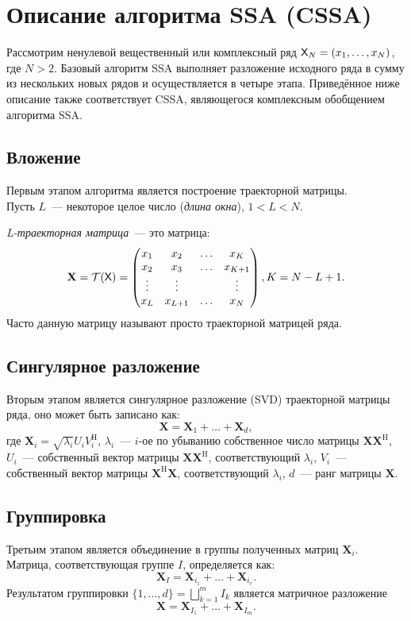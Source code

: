\documentclass[specialist,
               substylefile = spbu.rtx,
               subf,href,colorlinks=true, 12pt]{disser}
\begin{document}
\section{Описание алгоритма SSA (CSSA)}
Рассмотрим ненулевой вещественный или комплексный ряд $\textsf{X}_N = (x_1, \ldots, x_{N})$, где $N > 2$. Базовый алгоритм SSA выполняет разложение исходного ряда в сумму из нескольких новых рядов и осуществляется в четыре этапа. Приведённое ниже описание также соответствует CSSA, являющегося комплексным обобщением алгоритма SSA.
\subsection{Вложение}
Первым этапом алгоритма является построение траекторной матрицы.\\
Пусть $L$~--- некоторое целое число (\textit{длина окна}), $1 < L < N$.

\textit{L-траекторная матрица}~--- это матрица:
$$\mathbf{X} = \mathcal{T}(\textsf{X}) = \begin{pmatrix}
           x_1 & x_2 & \ldots & x_{K}\\
           x_2 & x_3 & \ldots & x_{K+1}\\
           \vdots & \vdots & & \vdots\\
           x_{L} & x_{L+1} & \ldots & x_{N}
         \end{pmatrix}, K = N - L + 1.$$
Часто данную матрицу называют просто траекторной матрицей ряда.
\subsection{Сингулярное разложение}
Вторым этапом является сингулярное разложение (SVD) траекторной матрицы ряда, оно может быть записано как:
$$\mathbf{X} = \mathbf{X}_1 + \ldots + \mathbf{X}_d,$$
где $\mathbf{X}_i = \sqrt{\lambda_i}U_i V_i^\mathrm{H}$, $\lambda_i$~--- $i$-ое по убыванию собственное число матрицы $\mathbf{X} \mathbf{X}^{\mathrm{H}}$, $U_i$~--- собственный вектор матрицы $\mathbf{X} \mathbf{X}^{\mathrm{H}}$, соответствующий $\lambda_i$, $V_i$~--- собственный вектор матрицы $\mathbf{X}^{\mathrm{H}} \mathbf{X}$, соответствующий $\lambda_i$, $d$~--- ранг матрицы $\mathbf{X}$.
\subsection{Группировка}
Третьим этапом является объединение в группы полученных матриц $\mathbf{X}_i$.
Матрица, соответствующая группе $I$, определяется как:
$$\mathbf{X}_I = \mathbf{X}_{i_1} + \ldots + \mathbf{X}_{i_r}.$$
Результатом группировки $\{1,\ldots,d\} = \bigsqcup_{k=1}^m I_k$ является матричное разложение
$$\mathbf{X} = \mathbf{X}_{I_1} + \ldots + \mathbf{X}_{I_m}.$$
\end{document}
